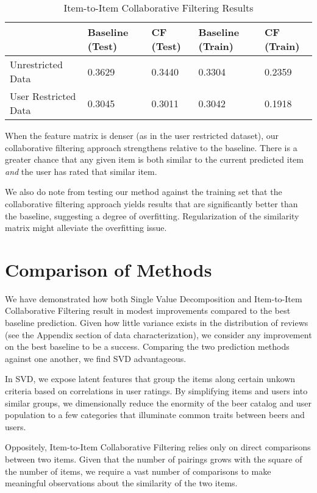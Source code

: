 \documentclass[12pt]{article}
\begin{document}
\begin{table}[ht!]
\centering
\caption{Item-to-Item Collaborative Filtering Results}
\label{my-label}
\begin{tabular}{lllll}
\hline
                        & Baseline (Test) & CF (Test) & Baseline (Train) & CF (Train) \\ \hline
Unrestricted Data     & 0.3629             & 0.3440                  & 0.3304              & 0.2359                   \\
User Restricted Data  & 0.3045             & 0.3011                  & 0.3042              & 0.1918                   \\ \hline
\end{tabular}
\end{table}

When the feature matrix is denser (as in the user restricted dataset), our collaborative filtering approach strengthens relative to the baseline. There is a greater chance that any given item is both similar to the current predicted item \textit{and} the user has rated that similar item.

We also do note from testing our method against the training set that the collaborative filtering approach yields results that are significantly better than the baseline, suggesting a degree of overfitting. Regularization of the similarity matrix might alleviate the overfitting issue.

\section{Comparison of Methods}
We have demonstrated how both Single Value Decomposition and Item-to-Item Collaborative Filtering result in modest improvements compared to the best baseline prediction. Given how little variance exists in the distribution of reviews (see the Appendix section of data characterization), we consider any improvement on the best baseline to be a success. Comparing the two prediction methods against one another, we find SVD advantageous.

In SVD, we expose latent features that group the items along certain unkown criteria based on correlations in user ratings. By simplifying items and users into similar groups, we dimensionally reduce the enormity of the beer catalog and user population to a few categories that illuminate common traits between beers and users.

Oppositely, Item-to-Item Collaborative Filtering relies only on direct comparisons between two items. Given that the number of pairings grows with the square of the number of items, we require a vast number of comparisons to make meaningful observations about the similarity of the two items.
\end{document}
